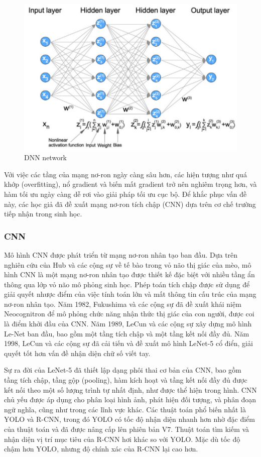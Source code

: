 \documentclass[a4paper]{article}
\begin{document}
\begin{figure}
    \centering
    \includegraphics[width=0.75\linewidth]{assets/dnn.png}
    \caption{DNN network}
    \label{fig:enter-label}
\end{figure}

Với việc các tầng của mạng nơ-ron ngày càng sâu hơn, các hiện tượng như quá khớp (overfitting), nổ gradient và biến mất gradient trở nên nghiêm trọng hơn, và hàm tối ưu ngày càng dễ rơi vào giải pháp tối ưu cục bộ. Để khắc phục vấn đề này, các học giả đã đề xuất mạng nơ-ron tích chập (CNN) dựa trên cơ chế trường tiếp nhận trong sinh học.

\subsubsection{CNN}
Mô hình CNN được phát triển từ mạng nơ-ron nhân tạo ban đầu. Dựa trên nghiên cứu của Hub và các cộng sự về tế bào trong vỏ não thị giác của mèo, mô hình CNN là một mạng nơ-ron nhân tạo được thiết kế đặc biệt với nhiều tầng ẩn thông qua lớp vỏ não mô phỏng sinh học. Phép toán tích chập được sử dụng để giải quyết nhược điểm của việc tính toán lớn và mất thông tin cấu trúc của mạng nơ-ron nhân tạo. Năm 1982, Fukushima và các cộng sự đã đề xuất khái niệm Neocognitron để mô phỏng chức năng nhận thức thị giác của con người, được coi là điểm khởi đầu của CNN. Năm 1989, LeCun và các cộng sự xây dựng mô hình Le-Net ban đầu, bao gồm một tầng tích chập và một tầng kết nối đầy đủ. Năm 1998, LeCun và các cộng sự đã cải tiến và đề xuất mô hình LeNet-5 cổ điển, giải quyết tốt hơn vấn đề nhận diện chữ số viết tay.

Sự ra đời của LeNet-5 đã thiết lập dạng phôi thai cơ bản của CNN, bao gồm tầng tích chập, tầng gộp (pooling), hàm kích hoạt và tầng kết nối đầy đủ được kết nối theo một số lượng trình tự nhất định, như được thể hiện trong hình. CNN chủ yếu được áp dụng cho phân loại hình ảnh, phát hiện đối tượng, và phân đoạn ngữ nghĩa, cũng như trong các lĩnh vực khác. Các thuật toán phổ biến nhất là YOLO và R-CNN, trong đó YOLO có tốc độ nhận diện nhanh hơn nhờ đặc điểm của thuật toán và đã được nâng cấp lên phiên bản V7. Thuật toán tìm kiếm và nhận diện vị trí mục tiêu của R-CNN hơi khác so với YOLO. Mặc dù tốc độ chậm hơn YOLO, nhưng độ chính xác của R-CNN lại cao hơn.
\end{document}
